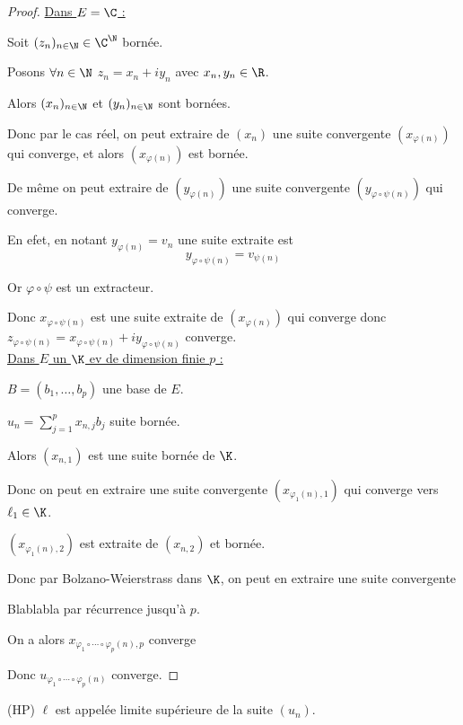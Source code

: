 \begin{proof}
    \uline{Dans $E = \C$ :}

    Soit $(z_n)_{n \in \N} \in \C^{\N}$ bornée. 

    Posons $\forall n \in \N$ $z_n = x_n + i y_n$ avec $x_n, y_n \in \R$.

    Alors $(x_n)_{n \in \N}$ et $(y_n)_{n \in \N}$ sont bornées.

    Donc par le cas réel, on peut extraire de $(x_n)$ une suite convergente $(x_{\varphi(n)})$
    qui converge, et alors $(x_{\varphi(n)})$ est bornée. 

    De même on peut extraire de $(y_{\varphi(n)})$ une suite convergente $(y_{\varphi \circ \psi(n)})$ 
    qui converge. 

    En efet, en notant $y_{\varphi(n)} = v_n$ une suite extraite est 
    $$y_{\varphi \circ \psi(n)} = v_{\psi(n)}$$

    Or $\varphi \circ \psi$ est un extracteur.

    Donc $x_{\varphi \circ \psi(n)}$ est une suite extraite de $(x_{\varphi(n)})$ qui converge
    donc $z_{\varphi \circ \psi(n)} = x_{\varphi \circ \psi(n)} + i y_{\varphi \circ \psi(n)}$ converge. \\

    \uline{Dans $E$ un $\K$ ev de dimension finie $p$ :}

    \svspace $B = (b_1, \dots, b_p)$ une base de $E$.

    $u_n = \sum_{j = 1}^{p } x_{n, j} b_j$ suite bornée. 

    Alors $(x_{n, 1})$ est une suite bornée de $\K$.    

    Donc on peut en extraire une suite convergente $(x_{\varphi_1(n), 1})$ 
    qui converge vers $\ell_1 \in \K$.

    $(x_{\varphi_1(n), 2})$ est extraite de $(x_{n, 2})$ et bornée.

    Donc par Bolzano-Weierstrass dans $\K$, on peut en extraire une suite convergente

    Blablabla par récurrence jusqu'à $p$.

    On a alors $x_{\varphi_1 \circ \cdots \circ \varphi_p(n), p}$ converge 

    Donc $u_{\varphi_1 \circ \cdots \circ \varphi_p(n)}$ converge. 
\end{proof}


\begin{remarque} (HP) $\ell$ est appelée limite supérieure de la suite $(u_n)$.
\end{remarque}


